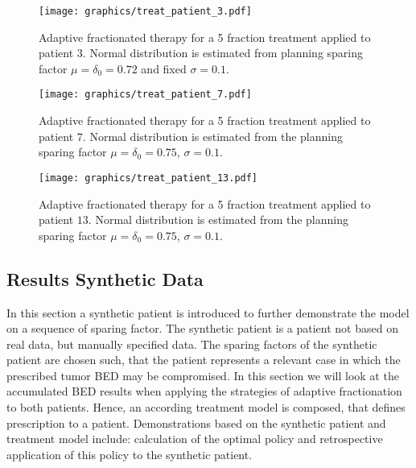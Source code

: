 \documentclass[\relativeRoot/ada.tex]{subfiles}
\begin{document}
\begin{figure}[!htb]
    \centering
    \texttt{[image: graphics/treat\_patient\_3.pdf]}
    \caption{Adaptive fractionated therapy for a 5 fraction treatment applied to patient $3$. Normal distribution is estimated from planning sparing factor $\mu=\delta_0=0.72$ and fixed $\sigma=0.1$.}
    \label{fig:treat_patient_3}
\end{figure}

\begin{figure}[!htb]
    \centering
    \texttt{[image: graphics/treat\_patient\_7.pdf]}
    \caption{Adaptive fractionated therapy for a 5 fraction treatment applied to patient $7$. Normal distribution is estimated from the planning sparing factor $\mu=\delta_0=0.75$, $\sigma=0.1$.}
    \label{fig:treat_patient_7}
\end{figure}

\begin{figure}[!htb]
    \centering
    \texttt{[image: graphics/treat\_patient\_13.pdf]}
    \caption{Adaptive fractionated therapy for a 5 fraction treatment applied to patient $13$. Normal distribution is estimated from the planning sparing factor $\mu=\delta_0=0.75$, $\sigma=0.1$.}
    \label{fig:treat_patient_13}
\end{figure}

\subsection{Results Synthetic Data}

In this section a synthetic patient is introduced to further demonstrate the model on a sequence of sparing factor. The synthetic patient is a patient not based on real data, but manually specified data. The sparing factors of the synthetic patient are chosen such, that the patient represents a relevant case in which the prescribed tumor BED may be compromised. In this section we will look at the accumulated BED results when applying the strategies of adaptive fractionation to both patients. Hence, an according treatment model is composed, that defines prescription to a patient. Demonstrations based on the synthetic patient and treatment model include: calculation of the optimal policy and retrospective application of this policy to the synthetic patient.
\end{document}
